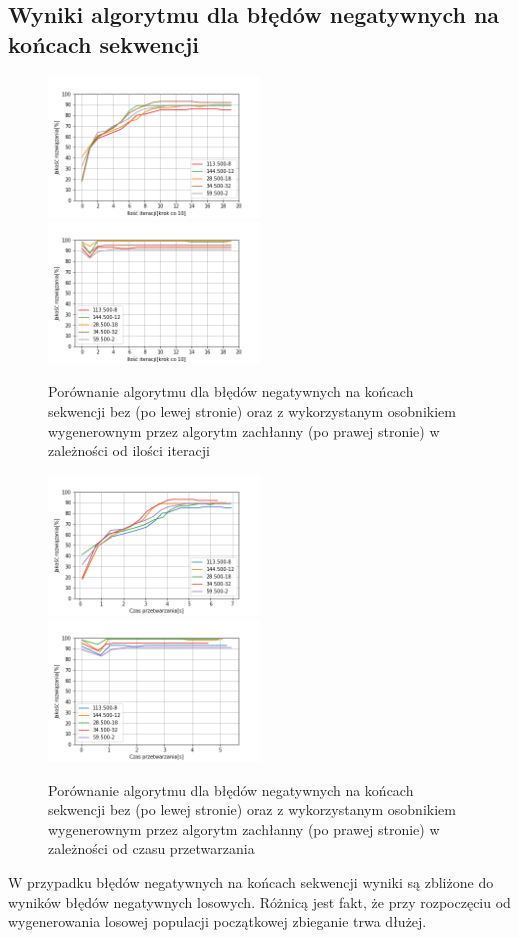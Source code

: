 \documentclass{article}
\begin{document}
\subsection{Wyniki algorytmu dla błędów negatywnych na końcach sekwencji}
\begin{figure}[H]
\includegraphics[width=0.5\textwidth]{neg-pow1.png}
\includegraphics[width=0.5\textwidth]{neg-pow-greedy1.png}
\caption{Porównanie algorytmu dla błędów negatywnych na końcach sekwencji bez (po lewej stronie) oraz z wykorzystanym osobnikiem wygenerownym przez algorytm zachłanny (po prawej stronie) w zależności od ilości iteracji}
\end{figure}
\begin{figure}[H]
\includegraphics[width=0.5\textwidth]{Czasneg-pow1.png}
\includegraphics[width=0.5\textwidth]{Czasneg-pow-greedy1.png}
\caption{Porównanie algorytmu dla błędów negatywnych na końcach sekwencji bez (po lewej stronie) oraz z wykorzystanym osobnikiem wygenerownym przez algorytm zachłanny (po prawej stronie) w zależności od czasu przetwarzania}
\end{figure}
W przypadku błędów negatywnych na końcach sekwencji wyniki są zbliżone do wyników błędów negatywnych losowych. Różnicą jest fakt, że przy rozpoczęciu od wygenerowania losowej populacji początkowej zbieganie trwa dłużej.
\end{document}
